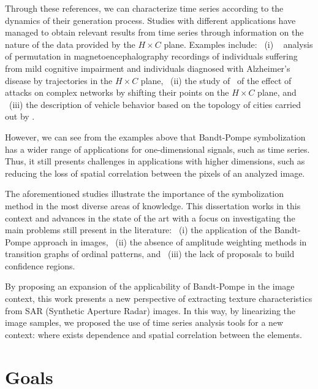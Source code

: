 Through these references, we can characterize time series according to the dynamics of their generation process.
Studies with different applications have managed to obtain relevant results from time series through information on the nature of the data provided by the $H \times C$ plane.
Examples include:
~(i) ~\cite{echegoyen2020permutation} analysis of permutation in magnetoencephalography recordings of individuals suffering from mild cognitive impairment and individuals diagnosed with Alzheimer's disease by trajectories in the $H \times C$ plane,
~(ii) the study of~\cite{InformationTheoryPerspectiveNetworkRobustness} of the effect of attacks on complex networks by shifting their points on the $H \times C$ plane, and
~(iii) the description of vehicle behavior based on the topology of cities carried out by \cite{CharacterizationVehicleBehaviorInformationTheory}.

However, we can see from the examples above that Bandt-Pompe symbolization has a wider range of applications for one-dimensional signals, such as time series.
Thus, it still presents challenges in applications with higher dimensions, such as reducing the loss of spatial correlation between the pixels of an analyzed image.

The aforementioned studies illustrate the importance of the symbolization method in the most diverse areas of knowledge.
This dissertation works in this context and advances in the state of the art with a focus on investigating the main problems still present in the literature: 
~(i) the application of the Bandt-Pompe approach in images, 
~(ii) the absence of amplitude weighting methods in transition graphs of ordinal patterns, and 
~(iii) the lack of proposals to build confidence regions.

By proposing an expansion of the applicability of Bandt-Pompe in the image context, this work presents a new perspective of extracting texture characteristics from SAR (Synthetic Aperture Radar) images.
In this way, by linearizing the image samples, we proposed the use of time series analysis tools for a new context: where exists dependence and spatial correlation between the elements.


\section{Goals}

